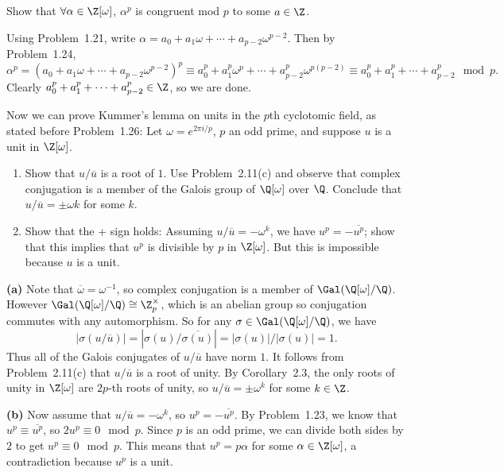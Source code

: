 \documentclass[11pt,letterpaper]{article}
\begin{document}
\begin{cproblem}{1.25}
    Show that $\forall \alpha\in\Z[\omega]$, $\alpha^p$ is congruent mod $p$ to some $a\in \Z$.    
\end{cproblem}

\begin{solution}
    Using Problem~1.21, write $\alpha=a_0+a_1\omega+\cdots+a_{p-2}\omega^{p-2}$. Then by Problem~1.24,
    \[
        \alpha^p=(a_0+a_1\omega+\cdots+a_{p-2}\omega^{p-2})^p\equiv a_0^p+a_1^p\omega^p+\cdots+a_{p-2}^p\omega^{p(p-2)}\equiv a_0^p+a_1^p+\cdots+a_{p-2}^p\mod p
    .\]  
    Clearly $a_0^p+a_1^p+\cdots+a_{p-2}^p\in \Z$, so we are done. 
\end{solution}


\begin{cproblem}{2.12}
    Now we can prove Kummer's lemma on units in the $p$th cyclotomic field, as stated before Problem~1.26: Let $\omega=e^{2\pi i / p}$, $p$ an odd prime, and suppose $u$ is a unit in $\Z[\omega]$.
    \begin{enumerate}
        \item Show that $u /\overline{u}$ is a root of $1$. Use Problem~2.11(c) and observe that complex conjugation is a member of the Galois group of $\Q[\omega]$ over $\Q$. Conclude that $u / \overline{u}=\pm \omega k$ for some $k$.  
        \item Show that the + sign holds: Assuming $u /\overline{u}=-\omega^k$, we have $u^p=-\overline{u^p}$; show that this implies that $u^p$ is divisible by $p$ in $\Z[\omega]$. But this is impossible because $u$ is a unit.
    \end{enumerate} 
\end{cproblem}

\begin{solution}
    \textbf{(a)} Note that $\overline{\omega}=\omega^{-1}$, so complex conjugation is a member of $\Gal(\Q[\omega]/\Q)$. However $\Gal(\Q[\omega]/\Q)\cong\Z^\times_p$, which is an abelian group so conjugation commutes with any automorphism. So for any $\sigma\in \Gal(\Q[\omega]/\Q)$, we have
    \[
        \left|\sigma(u /\overline{u})\right|=\left|\sigma(u) /\overline{\sigma(u)}\right|=\left|\sigma(u)\right| /\left|\sigma(u)\right|=1
    .\] 
    Thus all of the Galois conjugates of $u /\overline{u}$ have norm $1$. It follows from Problem~2.11(c) that $u /\overline{u}$ is a root of unity. By Corollary~2.3, the only roots of unity in $\Z[\omega]$ are $2p$-th roots of unity, so $u /\overline{u}=\pm\omega^k$ for some $k\in \Z$.   
    
    \textbf{(b)} Now assume that $u /\overline{u}=-\omega^k$, so $u^p=-\overline{u^p}$. By Problem~1.23, we know that $u^p\equiv \overline{u^p}$, so $2u^p\equiv 0\mod p$. Since $p$ is an odd prime, we can divide both sides by $2$ to get $u^p\equiv 0\mod p$. This means that $u^p=p\alpha$ for some $\alpha\in \Z[\omega]$, a contradiction because $u^p$ is a unit.  
\end{solution}
\end{document}
